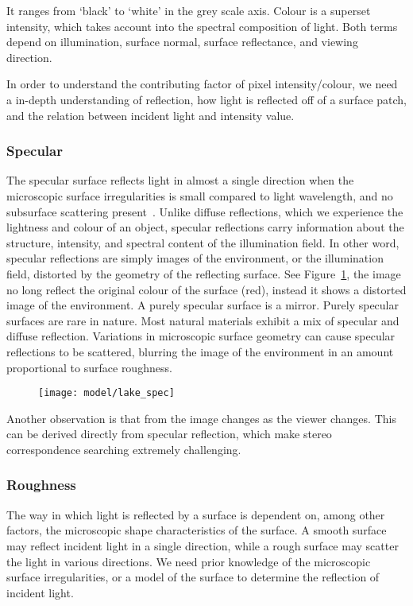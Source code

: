 It ranges from `black' to `white' in the grey scale axis. Colour is a superset intensity, which takes account into the spectral composition of light. Both terms depend on illumination, surface normal, surface reflectance, and viewing direction.

In order to understand the contributing factor of pixel intensity/colour, we need a in-depth understanding of reflection, \ie how light is reflected off of a surface patch, and the relation between incident light and intensity value.

\subsubsection{Specular}
The specular surface reflects light in almost a single direction when the microscopic surface irregularities is small compared to light wavelength, and no subsurface scattering present~\cite{nayar1989surface}. Unlike diffuse reflections, which we experience the lightness and colour of an object, specular reflections carry information about the structure, intensity, and spectral content of the illumination field. In other word, specular reflections are simply images of the environment, or the illumination field, distorted by the geometry of the reflecting surface. See Figure~\ref{fig:lake_spec}, the image no long reflect the original colour of the surface (red), instead it shows a distorted image of the environment. A purely specular surface is a mirror. Purely specular surfaces are rare in nature. Most natural materials exhibit a mix of specular and diffuse reflection. Variations in microscopic surface geometry can cause specular reflections to be scattered, blurring the image of the environment in an amount proportional to surface roughness.

\begin{figure}[h]
\centering
\texttt{[image: model/lake\_spec]}
\label{fig:lake_spec}
\end{figure}

Another observation is that from the image changes as the viewer changes. This can be derived directly from specular reflection, which make stereo correspondence searching extremely challenging.

\subsubsection{Roughness}
The way in which light is reflected by a surface is dependent on, among other factors, the microscopic shape characteristics of the surface. A smooth surface may reflect incident light in a single direction, while a rough surface may scatter the light in various directions. We need prior knowledge of the microscopic surface irregularities, or a model of the surface to determine the reflection of incident light.

